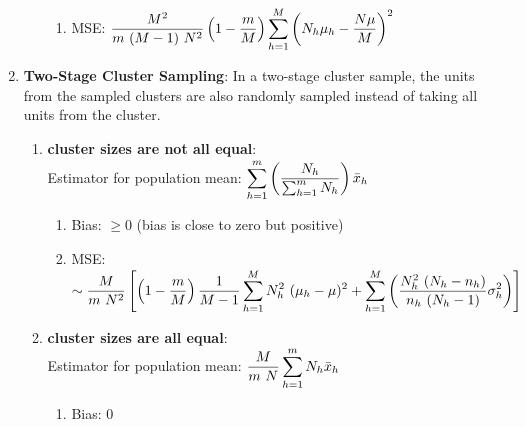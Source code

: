 \begin{enumerate}[itemsep=0.2cm]
\begin{enumerate}
\begin{enumerate}[itemsep=0.25cm]
            \item MSE: $
                \dfrac{M^2}{m\ (M-1)\ N^2}
                \left(1 - \dfrac{m}{M}\right)
                \displaystyle\sum_{h=1}^M \left(N_h\mu_h - \dfrac{N\mu}{M}\right)^2
            $
            \hfill \cite{statistics/book/Statistics-for-Data-Scientists/Maurits-Kaptein}
        \end{enumerate}
    \end{enumerate}


    \item \textbf{Two-Stage Cluster Sampling}\label{Sampling Plans/Representative Sampling/Cluster Sampling/Two-Stage Cluster Sampling}: In a two-stage cluster sample, the units from the sampled clusters are also randomly sampled instead of taking all units from the cluster.
    \hfill \cite{statistics/book/Statistics-for-Data-Scientists/Maurits-Kaptein}
    \begin{enumerate}
        \item \textbf{cluster sizes are not all equal}:
        \\
        Estimator for population mean: $
            \displaystyle\sum_{h=1}^{m}
            \left(
                \dfrac{N_h}{
                    \textstyle\sum_{h=1}^{m} N_h
                }
            \right)
            \bar{x}_h
        $
        \hfill \cite{statistics/book/Statistics-for-Data-Scientists/Maurits-Kaptein}
        \begin{enumerate}[itemsep=0.25cm]
            \item Bias: $\geq 0$ (bias is close to zero but positive)
            \hfill \cite{statistics/book/Statistics-for-Data-Scientists/Maurits-Kaptein}
    
            \item MSE: $
                \sim 
                \dfrac{M}{m\ N^2}
                \left[
                    \left(1 - \dfrac{m}{M}\right)
                    \dfrac{1}{M-1}
                    \displaystyle\sum_{h=1}^{M} N_h^2\ (\mu_h - \mu)^2
                    + \displaystyle\sum_{h=1}^{M} \left(
                        \dfrac{N_h^2\ (N_h-n_h)}{n_h\ (N_h-1)}
                        \sigma_h^2
                    \right)
                \right]
            $
            \hfill \cite{statistics/book/Statistics-for-Data-Scientists/Maurits-Kaptein}
        \end{enumerate}


        \item \textbf{cluster sizes are all equal}:
        \\
        Estimator for population mean: $
            \dfrac{M}{m\ N}
            \dsum_{h=1}^{m}
            N_h \bar{x}_h
        $
        \hfill \cite{statistics/book/Statistics-for-Data-Scientists/Maurits-Kaptein}
        \begin{enumerate}[itemsep=0.25cm]
            \item Bias: $0$
            \hfill \cite{statistics/book/Statistics-for-Data-Scientists/Maurits-Kaptein}
    

\end{enumerate}
\end{enumerate}
\end{enumerate}
